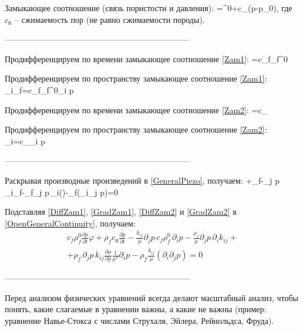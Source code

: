\documentclass[main.tex]{subfiles}
\begin{document}
Замыкающее соотношение (связь пористости и давления):
\beq\label{Zam2}
\varphi=\varphi^0+c_{}\left(p-p_0\right),
\eeq
где $c_{\text{п}}$ -- сжимаемость пор (не равно сжимаемости породы).

--------------------------------------------------------------------

Продифференцируем по времени замыкающее соотношение \eqref{Zam1}:
\beq\label{DiffZam1}
=c_f\rho_f^0
\eeq

Продифференцируем по пространству замыкающее соотношение \eqref{Zam1}:
\beq\label{GradZam1}
\partial_i\rho_f=c_f\rho_f^0\partial_i p
\eeq

Продифференцируем по времени замыкающее соотношение \eqref{Zam2}:
\beq\label{DiffZam2}
=c_
\eeq

Продифференцируем по пространству замыкающее соотношение \eqref{Zam2}:
\beq\label{GradZam2}
\partial_i\varphi=c_\partial_i p
\eeq

--------------------------------------------------------------------

Раскрывая производные произведений в \eqref{GeneralPiezo}, получаем:
\beq\label{OpenGeneralContinuity}
\varphi+\rho_f-\partial_j p\,\partial_i\rho_f-\rho_f\partial_j p\,\partial_i\!\left(\right)-\rho_f\left(\partial_i\partial_j p\right)=0
\eeq

Подставляя \eqref{DiffZam1}, \eqref{GradZam1}, \eqref{DiffZam2} и \eqref{GradZam2} в \eqref{OpenGeneralContinuity}, получаем:
\begin{multline}\label{Expanded}
c_f\rho_f^0\frac{\partial p}{\partial t}\varphi+\rho_f c_\text{п}\frac{\partial p}{\partial t}-\frac{k_{ij}}{\mu}\partial_j p\,c_f\rho_f^0\,\partial_i p-\frac{\rho_f}{\mu}\partial_j p\,\partial_i k_{ij}+\\+\rho_f\,\partial_j p\,k_{ij}\frac{\partial\mu}{\partial p}\frac{1}{\mu^2}\partial_i p-\rho_f\frac{k_{ij}}{\mu}\left(\partial_i\partial_j p\right)=0
\end{multline}

--------------------------------------------------------------------

Перед анализом физических уравнений всегда делают масштабный анализ, чтобы понять, какие слагаемые в уравнении важны, а какие не важны (пример: уравнение Навье-Стокса с числами Струхаля, Эйлера, Рейнольдса, Фруда).
\end{document}
